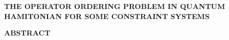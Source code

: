 \documentclass{article}
\begin{document}
    
    \pagestyle{fancy}
    \fancyhf{}
    \rhead{\hei\xiaowu\thistitle}
    \renewcommand{\headrulewidth}{0.4pt}

    \thispagestyle{fancy} %

    \begin{center}
        \vspace*{16pt} %
        \hei\sanhao{\thistitle}
    \end{center}
    \vspace*{14pt} %
    \begin{center} 
        \hei{}
        \vspace*{16pt} %
    \end{center}
    


    \clearpage

    \begin{center}
        \vspace*{16pt} %
         \textbf{\sanhao THE OPERATOR ORDERING PROBLEM IN QUANTUM HAMITONIAN FOR SOME CONSTRAINT SYSTEMS}
    \end{center}
    \vspace*{14pt} %
    \begin{center}
        \textbf{\xiaosan ABSTRACT}
        \vspace*{16pt} %
    \end{center}
    
    \clearpage
   

    \vspace*{16pt} %
    \tableofcontents


    
    \clearpage %
    \thispagestyle{fancy}
    \setcounter{page}{1} %
\end{document}
